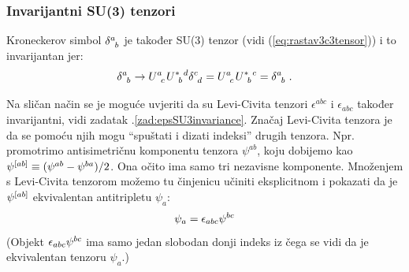 \subsubsection{Invarijantni SU(3) tenzori}

Kroneckerov simbol $\tensor{\delta}{^a_b}$ je također SU(3) 
tenzor (vidi (\ref{eq:rastav3c3tensor})) i to invarijantan jer:
\begin{equation*}
\tensor{\delta}{^a_b} \to  \tensor{U}{^a_c}
\tensor{U}{^*_b^d} \tensor{\delta}{^c_d} = 
\tensor{U}{^a_c} \tensor{U}{^*_b^c} = \tensor{\delta}{^a_b} \;.
\end{equation*}

Na sličan način se je moguće uvjeriti da su Levi-Civita
tenzori $\epsilon^{abc}$  i $\epsilon_{abc}$ 
također invarijantni, vidi zadatak \thechapter.\ref{zad:epsSU3invariance}. 
Značaj Levi-Civita tenzora je da se pomoću
njih mogu ``spuštati i dizati indeksi'' drugih tenzora.
Npr. promotrimo antisimetričnu komponentu tenzora $\psi^{ab}$,
koju dobijemo kao $\tensor{\psi}{^{[ab]}} \equiv (\psi^{ab}-\psi^{ba})/2$.
Ona očito ima samo tri nezavisne komponente. Množenjem s 
Levi-Civita tenzorom možemo tu činjenicu učiniti eksplicitnom
i pokazati da je $\tensor{\psi}{^{[ab]}}$ ekvivalentan
antitripletu $\psi_a$:
\begin{equation}
  \psi_a = \epsilon_{abc} \tensor{\psi}{^{bc}}
\label{eq:spustanjeindeksa}
\end{equation}
(Objekt $\epsilon_{abc} \tensor{\psi}{^{bc}}$ ima samo jedan slobodan
donji indeks  iz čega se vidi da je ekvivalentan tenzoru $\psi_a$.)

